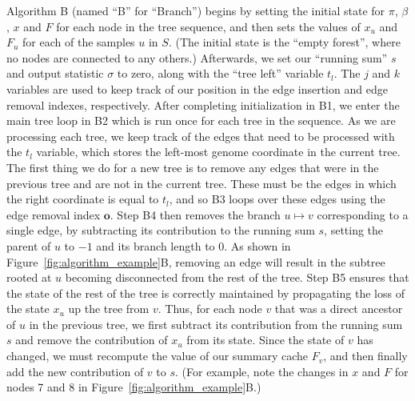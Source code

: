 \documentclass[9pt,twoside,lineno]{gsajnl}
\newcommand{\algorithmref}[1]{#1}
\newcommand{\indexout}[0]{\ensuremath{\mathbf{o}}}
\begin{document}
Algorithm \algorithmref{B} (named ``B'' for ``Branch'')
begins by setting the initial state for $\pi$, $\beta$,
$x$ and $F$ for each node in the tree sequence, and then sets the values
of $x_u$ and $F_u$ for each of the samples $u$ in $S$.
(The initial state is the ``empty forest'', where no nodes are connected to any others.)
Afterwards, we set our ``running sum'' $s$ and output statistic $\sigma$ to zero, along
with the ``tree left'' variable $t_l$. The $j$ and $k$ variables are
used to keep track of our position in the edge insertion and edge
removal indexes, respectively. After completing initialization in
\algorithmref{B1}, we enter the main tree loop in \algorithmref{B2} which is
run once for each tree in the sequence. As we are processing each
tree, we keep track of the edges that need to be processed with
the $t_l$ variable, which stores the left-most genome coordinate
in the current tree. The first thing we do for a new tree is to
remove any edges that were in the previous tree and are not in the
current tree. These must be the edges in which the right coordinate
is equal to $t_l$, and so \algorithmref{B3} loops over these edges using
the edge removal index $\indexout$. Step \algorithmref{B4} then removes
the branch $u \mapsto v$ corresponding to a single edge, by
subtracting its contribution to the running sum $s$, setting the parent of
$u$ to $-1$ and its branch length to $0$. As shown in
Figure~\ref{fig:algorithm_example}B, removing an edge will result
in the subtree rooted at $u$ becoming disconnected from the rest of the
tree. Step \algorithmref{B5} ensures that the state of the rest of the tree
is correctly maintained by propagating the loss of the state $x_u$
up the tree from $v$. Thus, for each node $v$ that was a
direct ancestor of $u$ in the previous tree, we first subtract
its contribution from the running sum $s$ and remove the contribution
of $x_u$ from its state. Since the state of $v$ has changed, we must
recompute the value of our summary cache $F_v$, and then finally
add the new contribution of $v$ to $s$. (For example, note the changes in $x$
and $F$ for nodes 7 and 8 in Figure~\ref{fig:algorithm_example}B.)
\end{document}

